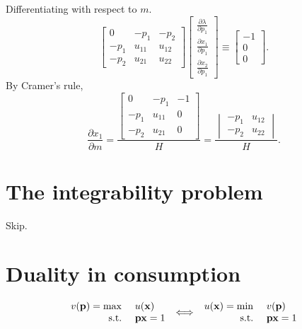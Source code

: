 Differentiating with respect to $m$.
\[
    \begin{bmatrix}
        0 & -p_1 &-p_2 \\
        -p_1 & u_{11} & u_{12} \\
        -p_2 & u_{21} & u_{22}
        \end{bmatrix}
        \begin{bmatrix}
        \frac{\partial \lambda}{\partial p_1} \\
        \frac{\partial x_1}{\partial p_1}\\
        \frac{\partial x_2}{\partial p_1}
        \end{bmatrix}
        \equiv
        \begin{bmatrix}
        -1 \\
        0 \\
        0
    \end{bmatrix}.
\]
By Cramer's rule,
\[
    \frac{\partial x_1}{\partial m} = 
    \frac{
    \begin{bmatrix}
    0 & -p_1 &-1 \\
    -p_1 & u_{11} & 0 \\
    -p_2 & u_{21} & 0
    \end{bmatrix}
    }{H}
    =
    \frac{
    \begin{vmatrix}
    -p_1 & u_{12} \\
    -p_2 & u_{22}
    \end{vmatrix}
    }{H}.
\] 
\section{The integrability problem}
Skip.

\section{Duality in consumption}
\[
    \begin{array}{r l}
        v(\mathbf{p}) = \max & \ u(\mathbf{x}) \\
        \text{s.t.} & \ \mathbf{px} = 1 
    \end{array}
    \iff
    \begin{array}{r l}
        u(\mathbf{x}) = \min & \ v(\mathbf{p}) \\
        \text{s.t.} & \ \mathbf{px} = 1 
    \end{array}
\]


